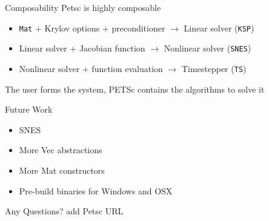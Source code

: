 \documentclass{beamer}
\begin{document}
\begin{frame}{Composability}
Petsc is highly composable
\begin{itemize}
  \item \texttt{Mat} + Krylov options + preconditioner $\rightarrow$ Linear solver (\texttt{KSP})
  \item Linear solver + Jacobian function $\rightarrow$ Nonlinear solver (\texttt{SNES})
  \item Nonlinear solver + function evaluation $\rightarrow$ Timestepper (\texttt{TS})
\end{itemize}
\hfill

The user forms the system, PETSc contains the algorithms to solve it
\end{frame}



\begin{frame}{Future Work}
  \begin{itemize}
    \item SNES
    \item More Vec abstractions
    \item More Mat constructors
    \item Pre-build binaries for Windows and OSX
  \end{itemize}
\end{frame}

\begin{frame}
\begin{center}  
Any Questions?
add Petsc URL
\end{center}

\end{frame}
\end{document}

